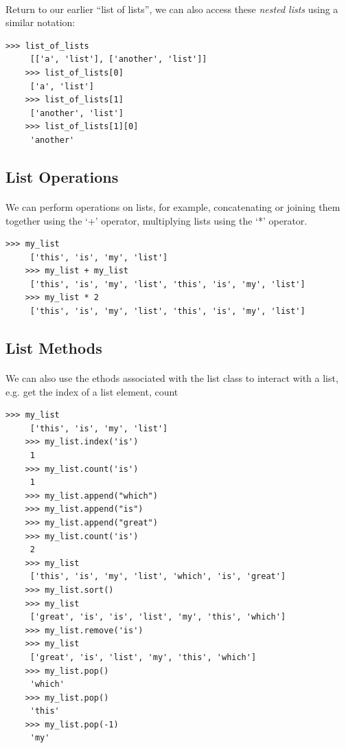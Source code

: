 \documentclass[12pt, a4paper, oneside]{book}
\begin{document}
\paragraph{} Return to our earlier ``list of lists'', we can also access these \emph{nested lists} using a similar notation:

\begin{lstlisting}[style=DOS]
    >>> list_of_lists
     [['a', 'list'], ['another', 'list']]
    >>> list_of_lists[0]
     ['a', 'list']
    >>> list_of_lists[1]
     ['another', 'list']
    >>> list_of_lists[1][0]
     'another'
\end{lstlisting}

\subsection{List Operations}

\paragraph{} We can perform operations on lists, for example, concatenating or joining them together using the `+' operator, multiplying lists using the `*' operator.

\begin{lstlisting}[style=DOS]
    >>> my_list
     ['this', 'is', 'my', 'list']
    >>> my_list + my_list
     ['this', 'is', 'my', 'list', 'this', 'is', 'my', 'list']
    >>> my_list * 2
     ['this', 'is', 'my', 'list', 'this', 'is', 'my', 'list']
\end{lstlisting}

\subsection{List Methods}

\paragraph{} We can also use the ethods associated with the list class to interact with a list, e.g. get the index of a list element, count 

\begin{lstlisting}[style=DOS]
    >>> my_list 
     ['this', 'is', 'my', 'list']
    >>> my_list.index('is')
     1
    >>> my_list.count('is')
     1
    >>> my_list.append("which")
    >>> my_list.append("is")
    >>> my_list.append("great")
    >>> my_list.count('is')
     2
    >>> my_list
     ['this', 'is', 'my', 'list', 'which', 'is', 'great']
    >>> my_list.sort()
    >>> my_list
     ['great', 'is', 'is', 'list', 'my', 'this', 'which']
    >>> my_list.remove('is')
    >>> my_list
     ['great', 'is', 'list', 'my', 'this', 'which']
    >>> my_list.pop()
     'which'
    >>> my_list.pop()
     'this'
    >>> my_list.pop(-1)
     'my'
\end{lstlisting}
\end{document}
